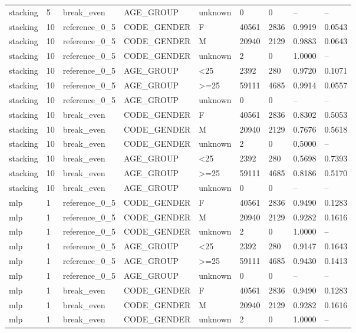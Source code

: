 \begin{longtable}{lllllllll}
stacking & 5 & break\_even & AGE\_GROUP & unknown & 0 & 0 & -- & -- \\
stacking & 10 & reference\_0\_5 & CODE\_GENDER & F & 40561 & 2836 & 0.9919 & 0.0543 \\
stacking & 10 & reference\_0\_5 & CODE\_GENDER & M & 20940 & 2129 & 0.9883 & 0.0643 \\
stacking & 10 & reference\_0\_5 & CODE\_GENDER & unknown & 2 & 0 & 1.0000 & -- \\
stacking & 10 & reference\_0\_5 & AGE\_GROUP & <25 & 2392 & 280 & 0.9720 & 0.1071 \\
stacking & 10 & reference\_0\_5 & AGE\_GROUP & >=25 & 59111 & 4685 & 0.9914 & 0.0557 \\
stacking & 10 & reference\_0\_5 & AGE\_GROUP & unknown & 0 & 0 & -- & -- \\
stacking & 10 & break\_even & CODE\_GENDER & F & 40561 & 2836 & 0.8302 & 0.5053 \\
stacking & 10 & break\_even & CODE\_GENDER & M & 20940 & 2129 & 0.7676 & 0.5618 \\
stacking & 10 & break\_even & CODE\_GENDER & unknown & 2 & 0 & 0.5000 & -- \\
stacking & 10 & break\_even & AGE\_GROUP & <25 & 2392 & 280 & 0.5698 & 0.7393 \\
stacking & 10 & break\_even & AGE\_GROUP & >=25 & 59111 & 4685 & 0.8186 & 0.5170 \\
stacking & 10 & break\_even & AGE\_GROUP & unknown & 0 & 0 & -- & -- \\
mlp & 1 & reference\_0\_5 & CODE\_GENDER & F & 40561 & 2836 & 0.9490 & 0.1283 \\
mlp & 1 & reference\_0\_5 & CODE\_GENDER & M & 20940 & 2129 & 0.9282 & 0.1616 \\
mlp & 1 & reference\_0\_5 & CODE\_GENDER & unknown & 2 & 0 & 1.0000 & -- \\
mlp & 1 & reference\_0\_5 & AGE\_GROUP & <25 & 2392 & 280 & 0.9147 & 0.1643 \\
mlp & 1 & reference\_0\_5 & AGE\_GROUP & >=25 & 59111 & 4685 & 0.9430 & 0.1413 \\
mlp & 1 & reference\_0\_5 & AGE\_GROUP & unknown & 0 & 0 & -- & -- \\
mlp & 1 & break\_even & CODE\_GENDER & F & 40561 & 2836 & 0.9490 & 0.1283 \\
mlp & 1 & break\_even & CODE\_GENDER & M & 20940 & 2129 & 0.9282 & 0.1616 \\
mlp & 1 & break\_even & CODE\_GENDER & unknown & 2 & 0 & 1.0000 & -- \\

\end{longtable}
